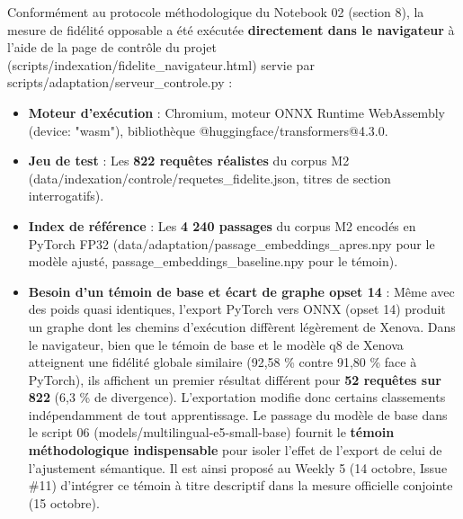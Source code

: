 \documentclass[11pt,a4paper]{article}
\newcommand{\code}[1]  {{\ttfamily #1}}
\begin{document}
Conformément au protocole méthodologique du Notebook 02 (section 8), la mesure de fidélité opposable a été exécutée \textbf{directement dans le navigateur} à l'aide de la page de contrôle du projet (\code{scripts/\allowbreak{}indexation/\allowbreak{}fidelite\_\allowbreak{}navigateur.\allowbreak{}html}) servie par \code{scripts/\allowbreak{}adaptation/\allowbreak{}serveur\_\allowbreak{}controle.\allowbreak{}py} :
\begin{itemize}
\item \textbf{Moteur d'exécution} : Chromium, moteur ONNX Runtime WebAssembly (\code{device:\allowbreak{} "wasm"}), bibliothèque \code{@\allowbreak{}huggingface/\allowbreak{}transformers@\allowbreak{}4.\allowbreak{}3.\allowbreak{}0}.
\item \textbf{Jeu de test} : Les \textbf{822 requêtes réalistes} du corpus M2 (\code{data/\allowbreak{}indexation/\allowbreak{}controle/\allowbreak{}requetes\_\allowbreak{}fidelite.\allowbreak{}json}, titres de section interrogatifs).
\item \textbf{Index de référence} : Les \textbf{4 240 passages} du corpus M2 encodés en PyTorch FP32 (\code{data/\allowbreak{}adaptation/\allowbreak{}passage\_\allowbreak{}embeddings\_\allowbreak{}apres.\allowbreak{}npy} pour le modèle ajusté, \code{passage\_\allowbreak{}embeddings\_\allowbreak{}baseline.\allowbreak{}npy} pour le témoin).
\item \textbf{Besoin d'un témoin de base et écart de graphe opset 14} : Même avec des poids quasi identiques, l'export PyTorch vers ONNX (opset 14) produit un graphe dont les chemins d'exécution diffèrent légèrement de Xenova. Dans le navigateur, bien que le témoin de base et le modèle q8 de Xenova atteignent une fidélité globale similaire (92,58 \% contre 91,80 \% face à PyTorch), ils affichent un premier résultat différent pour \textbf{52 requêtes sur 822} (6,3 \% de divergence). L'exportation modifie donc certains classements indépendamment de tout apprentissage. Le passage du modèle de base dans le script 06 (\code{models/\allowbreak{}multilingual-\allowbreak{}e5-\allowbreak{}small-\allowbreak{}base}) fournit le \textbf{témoin méthodologique indispensable} pour isoler l'effet de l'export de celui de l'ajustement sémantique. Il est ainsi proposé au Weekly 5 (14 octobre, Issue \#11) d'intégrer ce témoin à titre descriptif dans la mesure officielle conjointe (15 octobre).
\end{itemize}
\end{document}
